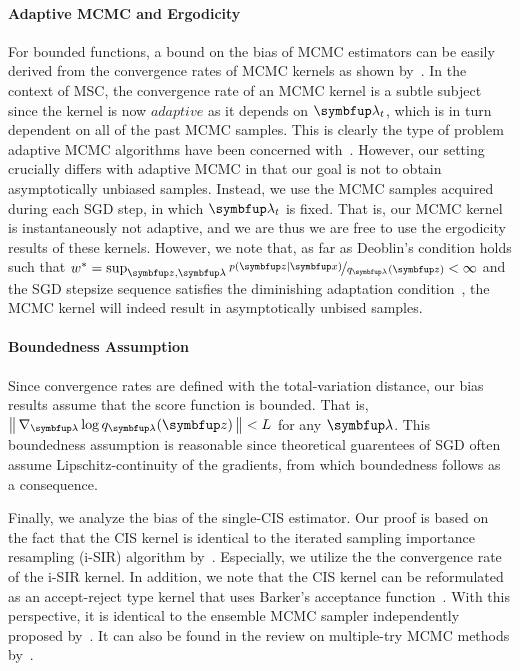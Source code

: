 \vspace{-0.05in}
\paragraph{Adaptive MCMC and Ergodicity}
For bounded functions, a bound on the bias of MCMC estimators can be easily derived from the convergence rates of MCMC kernels as shown by~\citet[Theorem 4]{jiang_mcmc_2021}.
In the context of MSC, the convergence rate of an MCMC kernel is a subtle subject since the kernel is now \(adaptive\) as it depends on \(\vlambda_t\), which is in turn dependent on all of the past MCMC samples.
This is clearly the type of problem adaptive MCMC algorithms have been concerned with~\citep{andrieu_ergodicity_2006}.
However, our setting crucially differs with adaptive MCMC in that our goal is not to obtain asymptotically unbiased samples.
Instead, we use the MCMC samples acquired during each SGD step, in which \(\vlambda_t\) is fixed.
That is, our MCMC kernel is instantaneously not adaptive, and we are thus we are free to use the ergodicity results of these kernels.
However, we note that, as far as Deoblin's condition holds such that \(w^* = \sup_{\vz, \vlambda} \nicefrac{p\left(\vz\mid\vx\right)}{q_{\vlambda}\left(\vz\right)}  < \infty\) and the SGD stepsize sequence satisfies the diminishing adaptation condition~\citep{10.2307/27595854}, the MCMC kernel will indeed result in asymptotically unbised samples.

\paragraph{Boundedness Assumption}
Since convergence rates are defined with the total-variation distance, our bias results assume that the score function is bounded.
That is, \(\norm{\nabla_{\vlambda} \log q_{\vlambda}(\vz)} < L\) for any \(\vlambda\).
This boundedness assumption is reasonable since theoretical guarentees of SGD often assume Lipschitz-continuity of the gradients, from which boundedness follows as a consequence.

%

%

%
Finally, we analyze the bias of the single-CIS estimator.
Our proof is based on the fact that the CIS kernel is identical to the iterated sampling importance resampling (i-SIR) algorithm by~\citet{andrieu_uniform_2018}.
Especially, we utilize the the convergence rate of the i-SIR kernel.
In addition, we note that the CIS kernel can be reformulated as an accept-reject type kernel that uses Barker's acceptance function~\citep{barker_monte_1965}.
With this perspective, it is identical to the ensemble MCMC sampler independently proposed by~\citet{austad_parallel_2007, neal_mcmc_2011a}.
It can also be found in the review on multiple-try MCMC methods by~\citet[Table 12]{martino_review_2018a}.
%

%
